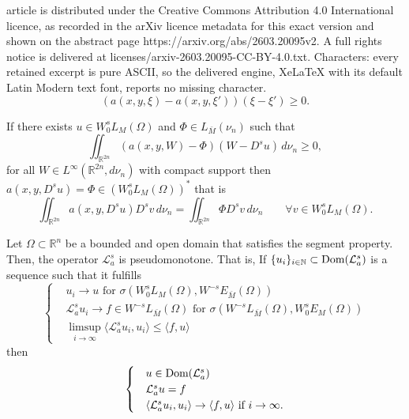 \documentclass[10pt,a4paper]{amsart}
\def\Dom{\text{\normalfont Dom}}
\newcommand{\A}{\mathcal{L}_a^s}
\newcommand{\N}{{\mathbb N}}
\newcommand{\R}{{\mathbb R}}
\begin{document}
article is distributed under the Creative Commons Attribution 4.0 International licence, as recorded in the arXiv licence metadata for this exact version and shown on the abstract page https://arxiv.org/abs/2603.20095v2. A full rights notice is delivered at licenses/arxiv-2603.20095-CC-BY-4.0.txt. Characters: every retained excerpt is pure ASCII, so the delivered engine, XeLaTeX with its default Latin Modern text font, reports no missing character.
\begin{equation}\label{MC}
(a(x,y,\xi)-a(x,y,\xi'))(\xi-\xi')\geq 0.
\end{equation}

\begin{lema}\label{paraEulerLagrange}
If there exists $u \in W_0^sL_M(\Omega)$ and $\Phi \in L_{\bar{M}}(\nu_n)$ such that
\begin{equation}\label{desi}
\iint_{\R^{2n}} (a(x,y,W)-\Phi)(W-D^s u)\,d\nu_n\geq 0,	
\end{equation}
for all $W\in L^{\infty}(\R^{2n},d\nu_n)$ with compact support then $a(x,y,D^su)=\Phi \in (W_0^sL_M(\Omega))^*$ that is
$$
\iint_{\R^{2n}}a(x,y,D^su)D^sv\,d\nu_n =\iint_{\R^{2n}}\Phi D^sv\,d\nu_n \qquad \forall v \in W_0^sL_M(\Omega).
$$
\end{lema}

\begin{teo}\label{pseudo}
Let $\Omega\subset \R^n$ be a bounded and open domain that satisfies the segment property. Then, the operator $\A$ is pseudomonotone. That is, If $\{u_i\}_{i\in \N}\subset \Dom(\A)$ is a sequence such that it fulfills
\begin{equation}\label{seq.pseudo}
\begin{cases}	
&u_i\to u\text{ for }\sigma(W_0^sL_M(\Omega),W^{-s}E_{\bar{M}}(\Omega))\\
&\A u_i\to f\in W^{-s}L_{\bar{M}}(\Omega)\text{ for }\sigma(W^{-s}L_{\bar{M}}(\Omega),W_0^sE_M(\Omega))\\
&\limsup_{i\to \infty}\langle \A u_i,u_i\rangle\leq \langle f,u\rangle
\end{cases}
\end{equation}
then 
\begin{equation}\label{tesis.pseudo}
\begin{cases}
&u\in \Dom(\A)
\\
&\A u=f
\\
&\langle \A u_i,u_i\rangle\to  \langle f,u\rangle\text{ if }i\to \infty.
\end{cases}
\end{equation}
\end{teo}
\end{document}
